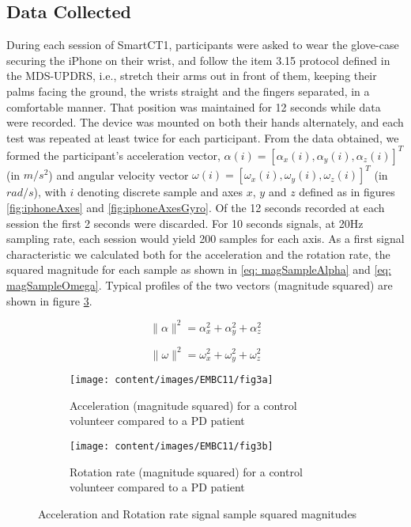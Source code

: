 \subsection{Data Collected}
\label{subsec:SmartCT1Data}
During each session of \gls{SmartCT1}, participants were asked to wear the glove-case securing the iPhone on their wrist, and follow the item 3.15 protocol defined in the \gls{MDS}-\gls{UPDRS}, i.e., stretch their arms out in front of them, keeping their palms facing the ground, the wrists straight and the fingers separated, in a comfortable manner. That position was maintained for 12 seconds while data were recorded. The device was mounted on both their hands alternately, and each test was repeated at least twice for each participant. From the data obtained, we formed the participant's acceleration vector, $\alpha(i) = [\alpha_{x}(i),\alpha_{y}(i),\alpha_{z}(i)]^{T}$ (in $m/s^{2}$) and angular velocity vector $\omega(i) = [\omega_{x}(i),\omega_{y}(i),\omega_{z}(i)]^{T}$ (in $rad/s$), with $i$ denoting discrete sample and axes $x$, $y$ and $z$ defined as in figures \ref{fig:iphoneAxes} and \ref{fig:iphoneAxesGyro}. Of the 12 seconds recorded at each session the first 2 seconds were discarded. For 10 seconds signals, at 20Hz sampling rate, each session would yield 200 samples for each axis. As a first signal characteristic we calculated both for the acceleration and the rotation rate, the squared magnitude for each sample as shown in \ref{eq: magSampleAlpha} and \ref{eq: magSampleOmega}. Typical profiles of the two vectors (magnitude squared) are shown in figure \ref{fig:signals}.

\begin{equation} \label{eq: magSampleAlpha}
\|\alpha\|^{2} = \alpha_{x}^{2} + \alpha_{y}^{2} + \alpha_{z}^{2}
\end{equation}

\begin{equation} \label{eq: magSampleOmega}
\|\omega\|^{2} = \omega_{x}^{2} + \omega_{y}^{2} + \omega_{z}^{2}
\end{equation}

\begin{figure}[h]
\centering
\begin{subfigure}{1\textwidth}
  \centering
  \texttt{[image: content/images/EMBC11/fig3a]}
  \caption{Acceleration (magnitude squared) for a control volunteer compared to a \gls{PD} patient}
  \label{fig:accelSig}
\end{subfigure}

\begin{subfigure}{1\textwidth}
  \centering
  \texttt{[image: content/images/EMBC11/fig3b]}
  \caption{Rotation rate (magnitude squared) for a control volunteer compared to a \gls{PD} patient}
  \label{fig:rotSig}
\end{subfigure}
\caption{Acceleration and Rotation rate signal sample squared magnitudes}
\label{fig:signals}
\end{figure}

